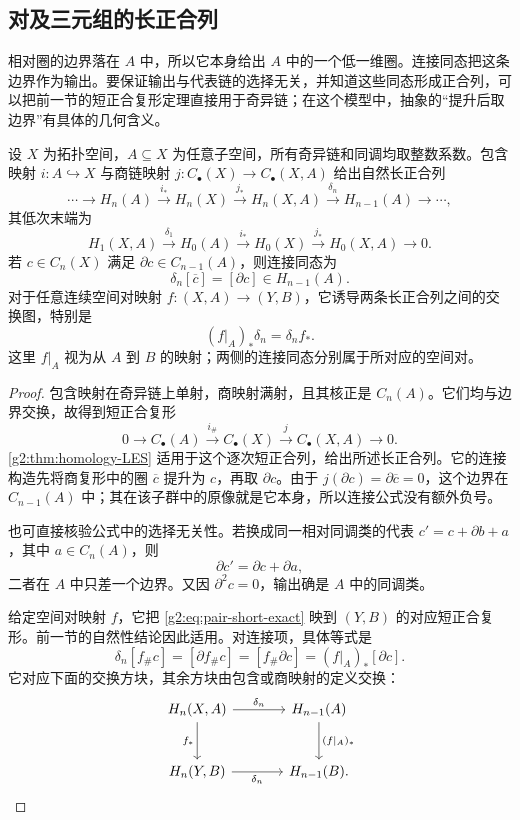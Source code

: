 \subsection{对及三元组的长正合列}
\label{g2:subsec:0202:04}
相对圈的边界落在 \(A\) 中，所以它本身给出 \(A\) 中的一个低一维圈。连接同态把这条边界作为输出。要保证输出与代表链的选择无关，并知道这些同态形成正合列，可以把前一节的短正合复形定理直接用于奇异链；在这个模型中，抽象的“提升后取边界”有具体的几何含义。

\begin{theorem}[空间对的长正合列]\label{g2:thm:pair-LES}
	设 \(X\) 为拓扑空间，\(A\subseteq X\) 为任意子空间，所有奇异链和同调均取整数系数。包含映射 \(i:A\hookrightarrow X\) 与商链映射 \(j:C_\bullet(X)\to C_\bullet(X,A)\) 给出自然长正合列
	\[
		\cdots\longrightarrow H_n(A)\xrightarrow{i_*}H_n(X)
		\xrightarrow{j_*}H_n(X,A)
		\xrightarrow{\delta_n}H_{n-1}(A)\longrightarrow\cdots,
	\]
	其低次末端为
	\[
		H_1(X,A)\xrightarrow{\delta_1}H_0(A)
		\xrightarrow{i_*}H_0(X)\xrightarrow{j_*}H_0(X,A)
		\longrightarrow0.
	\]
	若 \(c\in C_n(X)\) 满足 \(\partial c\in C_{n-1}(A)\)，则连接同态为
	\[
		\delta_n[\overline c]=[\partial c]\in H_{n-1}(A).
	\]
	对于任意连续空间对映射 \(f:(X,A)\to(Y,B)\)，它诱导两条长正合列之间的交换图，特别是
	\[
		(f|_A)_*\delta_n=\delta_n f_*.
	\]
	这里 \(f|_A\) 视为从 \(A\) 到 \(B\) 的映射；两侧的连接同态分别属于所对应的空间对。
\end{theorem}
\begin{proof}
	包含映射在奇异链上单射，商映射满射，且其核正是 \(C_n(A)\)。它们均与边界交换，故得到短正合复形
	\begin{equation}\label{g2:eq:pair-short-exact}
		0\longrightarrow C_\bullet(A)
		\xrightarrow{i_\#}C_\bullet(X)
		\xrightarrow{j}C_\bullet(X,A)\longrightarrow0.
	\end{equation}
	\cref{g2:thm:homology-LES} 适用于这个逐次短正合列，给出所述长正合列。它的连接构造先将商复形中的圈 \(\overline c\) 提升为 \(c\)，再取 \(\partial c\)。由于 \(j(\partial c)=\partial\overline c=0\)，这个边界在 \(C_{n-1}(A)\) 中；其在该子群中的原像就是它本身，所以连接公式没有额外负号。

	也可直接核验公式中的选择无关性。若换成同一相对同调类的代表 \(c'=c+\partial b+a\)，其中 \(a\in C_n(A)\)，则
	\[
		\partial c'=\partial c+\partial a,
	\]
	二者在 \(A\) 中只差一个边界。又因 \(\partial^2c=0\)，输出确是 \(A\) 中的同调类。

	给定空间对映射 \(f\)，它把 \eqref{g2:eq:pair-short-exact} 映到 \((Y,B)\) 的对应短正合复形。前一节的自然性结论因此适用。对连接项，具体等式是
	\[
		\delta_n[f_\#c]=[\partial f_\#c]
		=[f_\#\partial c]=(f|_A)_*[\partial c].
	\]
	它对应下面的交换方块，其余方块由包含或商映射的定义交换：
	\[
		\begin{tikzcd}[column sep=large,row sep=large]
			H_n(X,A) \arrow[r,"\delta_n"] \arrow[d,"f_*"']
				& H_{n-1}(A) \arrow[d,"(f|_A)_*"] \\
			H_n(Y,B) \arrow[r,"\delta_n"']
				& H_{n-1}(B).
		\end{tikzcd}
	\]
\end{proof}

